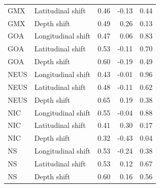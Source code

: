 \documentclass[11pt]{article}
\begin{document}
\begin{table}[ht]
\begin{tabular}{l l r r r}
GMX & Latitudinal shift  & 0.46 & -0.13 & 0.44 \\
GMX & Depth shift        & 0.49 & 0.26  & 0.13 \\
GOA & Longitudinal shift & 0.47 & 0.06  & 0.83 \\
GOA & Latitudinal shift  & 0.53 & -0.11 & 0.70 \\
GOA & Depth shift        & 0.60 & -0.19 & 0.49 \\
NEUS & Longitudinal shift & 0.43 & -0.01 & 0.96 \\
NEUS & Latitudinal shift  & 0.48 & -0.11 & 0.62 \\
NEUS & Depth shift        & 0.65 & 0.19  & 0.38 \\
NIC  & Longitudinal shift & 0.55 & -0.04 & 0.88 \\
NIC  & Latitudinal shift  & 0.41 & 0.30  & 0.17 \\
NIC  & Depth shift        & 0.32 & -0.43 & 0.04 \\
NS   & Longitudinal shift & 0.53 & -0.24 & 0.38 \\
NS   & Latitudinal shift  & 0.53 & 0.12  & 0.67 \\
NS   & Depth shift        & 0.60 & 0.16  & 0.56 \\
\hline
\end{tabular}
\end{table}
\end{document}
